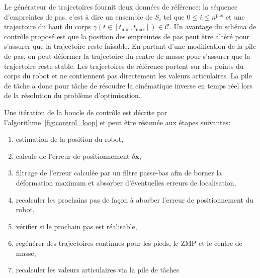 Le générateur de trajectoires fournit deux données de référence: la
séquence d'empreintes de pas, c'est à dire un ensemble de $S_i$ tel
que \mbox{$0 \leq i \leq n^{\text{pas}}$} et une trajectoire du haut
du corps \mbox{$\gamma(t \in [t_{\text{min}}, t_{\text{max}}]) \in
  \mathcal{C}$}. Un avantage du schéma de contrôle proposé est que la
position des empreintes de pas peut être altéré pour s'assurer que la
trajectoire reste faisable. En partant d'une modification de la pile
de pas, on peut déformer la trajectoire du centre de masse pour
s'assurer que la trajectoire reste stable. Les trajectoires de
référence portent sur des points du corps du robot et ne contiennent
pas directement les valeurs articulaires. La pile de tâche a donc pour
tâche de résoudre la cinématique inverse en temps réel lors de la
résolution du problème d'optimisation.

Une itération de la boucle de contrôle est décrite par l'algorithme~\ref{fig:control_loop} et peut être résumée aux étapes suivantes:

\begin{enumerate}
\item estimation de la position du robot,
\item calcule de l'erreur de positionnement \mbox{$\delta \mathbf{x}$},
\item filtrage de l'erreur calculée par un filtre passe-bas afin de
  borner la déformation maximum et absorber d'éventuelles erreurs de
  localisation,
\item recalculer les prochains pas de façon à aborber l'erreur de positionnement du robot,
\item vérifier si le prochain pas est réalisable,
\item regénérer des trajectoires continues pour les pieds, le ZMP et le centre de masse,
\item recalculer les valeurs articulaires via la pile de tâches
\end{enumerate}


